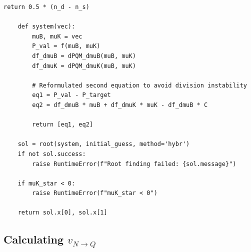 \documentclass[12pt]{article}
\begin{document}
\begin{lstlisting}[style=mypython]
        return 0.5 * (n_d - n_s)

    def system(vec):
        muB, muK = vec
        P_val = f(muB, muK)
        df_dmuB = dPQM_dmuB(muB, muK)
        df_dmuK = dPQM_dmuK(muB, muK)

        # Reformulated second equation to avoid division instability
        eq1 = P_val - P_target
        eq2 = df_dmuB * muB + df_dmuK * muK - df_dmuB * C

        return [eq1, eq2]

    sol = root(system, initial_guess, method='hybr')
    if not sol.success:
        raise RuntimeError(f"Root finding failed: {sol.message}")

    if muK_star < 0:
        raise RuntimeError(f"muK_star < 0")

    return sol.x[0], sol.x[1]
\end{lstlisting}

\subsection{Calculating $v_{N\to Q}$}
\end{document}
